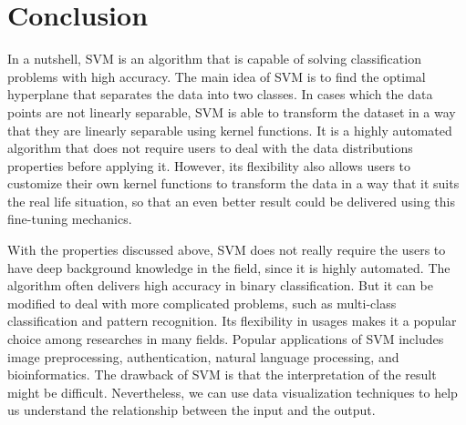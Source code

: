 
\section{Conclusion}
In a nutshell, SVM is an algorithm that is capable of solving classification
problems with high accuracy. The main idea of SVM is to find the optimal
hyperplane that separates the data into two classes. In cases which the data
points are not linearly separable, SVM is able to transform 
the dataset in a way that they are linearly separable using kernel functions.
It is a highly automated algorithm that does not require users to deal with
the data distributions properties before applying it. However, its flexibility
also allows users to customize their own kernel functions to transform the data
in a way that it suits the real life situation, so that an even better result
could be delivered using this fine-tuning mechanics.

With the properties discussed above, SVM does not really require the users to have deep background
knowledge in the field, since it is highly automated.
The algorithm often delivers high accuracy in binary classification. But it can be modified to deal 
with more complicated problems, such as multi-class classification and
pattern recognition. Its flexibility in usages makes it a popular choice among
researches in many fields. 
Popular applications of SVM includes image preprocessing, authentication, natural language
processing, and bioinformatics.
The drawback of SVM is that the interpretation of the
result might be difficult. Nevertheless, we can use data visualization techniques
to help us understand the relationship between the input and the output.
